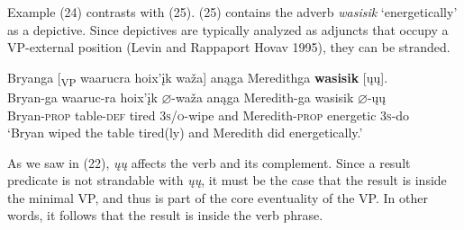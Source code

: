 \documentclass[output=paper]{LSP/langsci}
\begin{document}
\begin{exe}
\ex
\begin{xlist}



\end{xlist}
\end{exe}

Example (24) contrasts with (25).  (25) contains the adverb \emph{wasisik} `energetically' as a depictive. Since depictives are typically analyzed as adjuncts that occupy a VP-external position (Levin and Rappaport Hovav 1995), they can be stranded.

\begin{exe}

\ex \glll Bryanga [\textsubscript{VP} waarucra hoix'įk waža\textsc] anąga  Meredithga \textbf{wasisik} [ųų]. \\
 Bryan-ga {} waaruc-ra hoix'įk {$\varnothing$}-waža anąga Meredith-ga  wasisik {$\varnothing$}-ųų\\
Bryan-\textsc{prop} {} table-\textsc{def} tired \textsc{3s/o}-wipe and Meredith-\textsc{prop}  energetic \textsc{3s}-do\\
\glt `Bryan wiped the table tired(ly) and Meredith did energetically.'

\end{exe}

As we saw in (22), \textit{ųų} affects the verb and its complement. Since a result predicate is not strandable with \textit{ųų}, it must be the case that the result is inside the minimal VP, and thus is part of the core eventuality of the VP. In other words, it follows that the result is inside the verb phrase.
\end{document}
